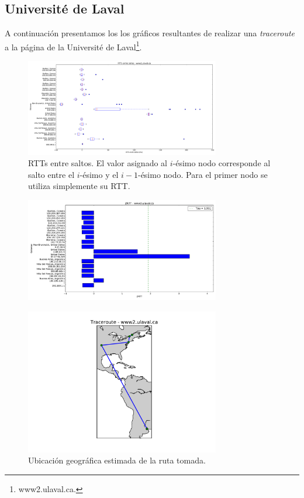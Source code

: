 \subsection{Université de Laval}

A continuación presentamos los los gráficos resultantes de realizar una \textit{traceroute} a la página de la Université de Laval\footnote{www2.ulaval.ca.}.

\begin{figure}[H]
    \centering
    \includegraphics[width=8.5cm]{img/grafico1-www2-ulaval-ca.pdf}
    \caption{RTTs entre saltos. El valor asignado al $i$-ésimo nodo corresponde al salto entre el $i$-ésimo y el $i - 1$-ésimo nodo. Para el primer nodo se utiliza simplemente su RTT.}
\end{figure}

\begin{figure}[H]
    \centering
    \includegraphics[width=8.5cm]{img/grafico2-www2-ulaval-ca.pdf}
    \caption{}
\end{figure}

\begin{figure}[H]
    \centering
    \includegraphics[width=8.5cm]{img/grafico3-www2-ulaval-ca.pdf}
    \caption{Ubicación geográfica estimada de la ruta tomada.}
\end{figure}

